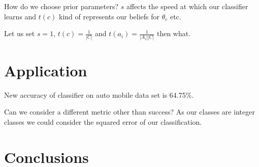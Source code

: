 How do we choose prior parameters? $s$ affects the speed at which our classifier learns and $t(c)$ kind of represents our beliefs for $\theta_c$ etc.

Let us set $s=1$, $t(c) = \frac{1}{|C|}$ and $t(a_i) = \frac{1}{|A_i||C|}$ then what.

\section{Application}

New accuracy of classifier on auto mobile data set is 64.75\%.

Can we consider a different metric other than success? As our classes are integer classes we could consider the squared error of our classification.

\section{Conclusions}